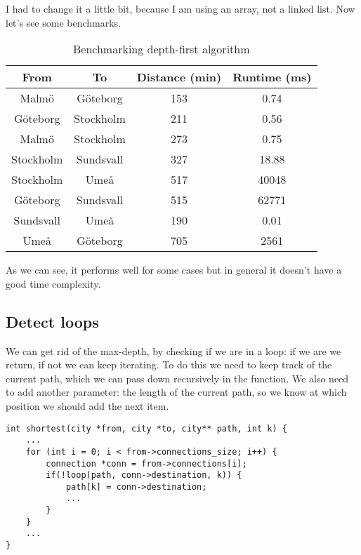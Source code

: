 \documentclass[a4paper,11pt]{article}
\begin{document}
    I had to change it a little bit, because I am using an array, not a linked list.
    Now let's see some benchmarks.

    \begin{table}[H]
        \begin{center}
            \begin{tabular}{c|c|c|c}
                \textbf{From} & \textbf{To} & \textbf{Distance (min)} & \textbf{Runtime (ms)}\\
                \hline
                Malmö  &   Göteborg     &  153 &     0.74\\
                Göteborg &    Stockholm    &  211 &     0.56\\
                Malmö &    Stockholm    &  273 &     0.75\\
                Stockholm &    Sundsvall    &  327 &     18.88\\
                Stockholm &    Umeå    &  517 &     40048\\
                Göteborg &    Sundsvall    &  515 &     62771\\
                Sundsvall &    Umeå    &  190 &     0.01\\
                Umeå &    Göteborg    &  705 &     2561\\
            \end{tabular}
            \caption{Benchmarking depth-first algorithm}
            \label{tab:table1}
        \end{center}
    \end{table}

    As we can see, it performs well for some cases but in general it doesn't have a good time complexity.

    \subsection*{Detect loops}
    We can get rid of the max-depth, by checking if we are in a loop: if we are we return, if not we can keep iterating.
    To do this we need to keep track of the current path, which we can pass down recursively in the function.
    We also need to add another parameter: the length of the current path, so we know at which position we should add the next item.

    \begin{verbatim}
int shortest(city *from, city *to, city** path, int k) {
    ...
    for (int i = 0; i < from->connections_size; i++) {
        connection *conn = from->connections[i];
        if(!loop(path, conn->destination, k)) {
            path[k] = conn->destination;
            ...
        }
    }
    ...
}
    \end{verbatim}
\end{document}
